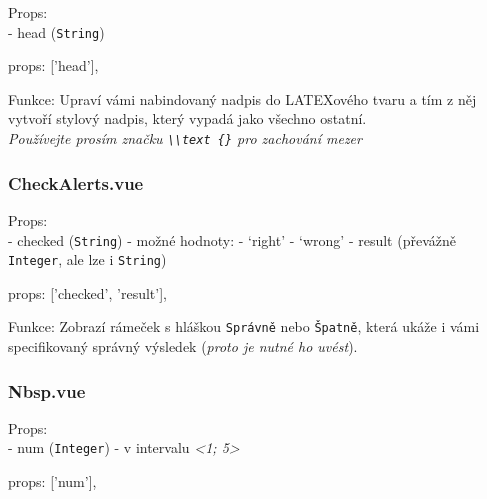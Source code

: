 \documentclass[
]{article}
\newenvironment{Shaded}{}{}
\newcommand{\NormalTok}[1]{#1}
\newcommand{\OperatorTok}[1]{\textcolor[rgb]{0.40,0.40,0.40}{#1}}
\newcommand{\StringTok}[1]{\textcolor[rgb]{0.25,0.44,0.63}{#1}}
\begin{document}
Props:\\
- head (\texttt{String})

\begin{Shaded}
\begin{Highlighting}[]
\NormalTok{props}\OperatorTok{:}\NormalTok{ [}\StringTok{'head'}\NormalTok{]}\OperatorTok{,}
\end{Highlighting}
\end{Shaded}

Funkce: Upraví vámi nabindovaný nadpis do LATEXového tvaru a tím z něj
vytvoří stylový nadpis, který vypadá jako všechno ostatní.\\
\emph{Používejte prosím značku
\texttt{\textbackslash{}\textbackslash{}text\ \{\}} pro zachování mezer}

\hypertarget{checkalerts.vue}{%
\subsubsection{CheckAlerts.vue}\label{checkalerts.vue}}

Props:\\
- checked (\texttt{String}) - možné hodnoty: - `right' - `wrong' -
result (převážně \texttt{Integer}, ale lze i \texttt{String})

\begin{Shaded}
\begin{Highlighting}[]
\NormalTok{props}\OperatorTok{:}\NormalTok{ [}\StringTok{'checked'}\OperatorTok{,} \StringTok{'result'}\NormalTok{]}\OperatorTok{,}
\end{Highlighting}
\end{Shaded}

Funkce: Zobrazí rámeček s hláškou \texttt{Správně} nebo \texttt{Špatně},
která ukáže i vámi specifikovaný správný výsledek (\emph{proto je nutné
ho uvést}).

\hypertarget{nbsp.vue}{%
\subsubsection{Nbsp.vue}\label{nbsp.vue}}

Props:\\
- num (\texttt{Integer}) - v intervalu \emph{\textless1;
5\textgreater{}}

\begin{Shaded}
\begin{Highlighting}[]
\NormalTok{props}\OperatorTok{:}\NormalTok{ [}\StringTok{'num'}\NormalTok{]}\OperatorTok{,}
\end{Highlighting}
\end{Shaded}
\end{document}

